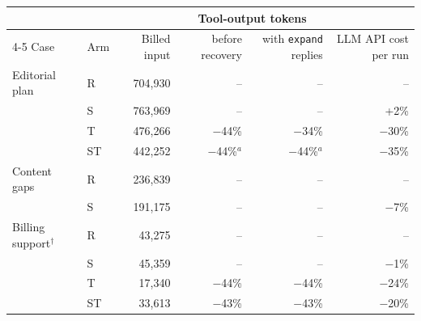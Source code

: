 \begin{tabular}{llrrrr}
\toprule
& & & \multicolumn{2}{c}{Tool-output tokens} & \\
\cmidrule(lr){4-5}
Case & Arm & Billed input & before recovery & with \texttt{expand} replies & LLM API cost per run \\
\midrule
Editorial plan & R & 704{,}930 & -- & -- & -- \\
 & S & 763{,}969 & -- & -- & +2\% \\
 & T & 476{,}266 & $-$44\% & $-$34\% & $-$30\% \\
 & ST & 442{,}252 & $-$44\%$^{a}$ & $-$44\%$^{a}$ & $-$35\% \\
\addlinespace
Content gaps & R & 236{,}839 & -- & -- & -- \\
 & S & 191{,}175 & -- & -- & $-$7\% \\
\addlinespace
Billing support$^\dagger$ & R & 43{,}275 & -- & -- & -- \\
 & S & 45{,}359 & -- & -- & $-$1\% \\
 & T & 17{,}340 & $-$44\% & $-$44\% & $-$24\% \\
 & ST & 33{,}613 & $-$43\% & $-$43\% & $-$20\% \\
\bottomrule
\end{tabular}
